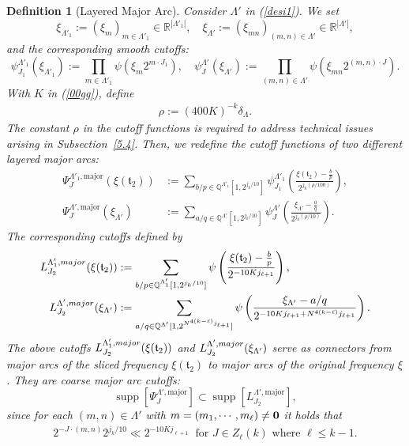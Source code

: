 \documentclass[10pt,a4paper]{amsart}
\newtheorem{definition}{Definition}\numberwithin{definition}{section}
\numberwithin{equation}{section}
\begin{document}
 \begin{definition}[Layered Major Arc] 
Consider $\Lambda'$ in (\ref{desi1}). We set
\[
\xi_{\Lambda'_{1}} := (\xi_{m})_{m\in \Lambda'_{1}} \in \mathbb{R}^{|\Lambda'_{1}|}, \quad
\xi_{\Lambda'} := (\xi_{mn})_{(m,n) \in \Lambda'} \in \mathbb{R}^{|\Lambda'|},
\]
and the corresponding smooth cutoffs:
\[
\psi^{\Lambda'_{1}}_{J_1}(\xi_{\Lambda'_{1}}) := \prod_{m \in \Lambda'_{1}} \psi\left( \xi_{m}   2^{m\cdot J_1} \right), \quad
\psi^{\Lambda'}_{J}(\xi_{\Lambda'}) := \prod_{(m,n)\in \Lambda'} \psi\left( \xi_{mn}   2^{(m,n)\cdot J} \right).
\]
With  $K$ in (\ref{00gg}), define  \begin{align}\label{rho3}
	\rho:=(400K)^{-k}\delta_{\Lambda}.
\end{align}The constant $\rho$ in the cutoff functions is required to address technical issues arising in Subsection~\ref{5.4}. Then,
we redefine the cutoff functions of two different layered major arcs:
\begin{align}\label{4022k9}
\Psi^{\Lambda'_{1},\mathrm{major}}_{J}(\xi(\mathfrak{t}_2)) &:= \sum_{b/p \in \mathbb{Q}^{\Lambda'_{1}}[1, 2^{j_k/10}]}
\psi^{\Lambda'_{1}}_{J_1} \left( \frac{\xi(\mathfrak{t}_2) - \frac{b}{p}}{2^{j_k(\rho/100)}} \right), \nonumber \\
\Psi^{\Lambda',\mathrm{major}}_{J}(\xi_{\Lambda'}) &:= \sum_{a/q \in \mathbb{Q}^{\Lambda'}[1, 2^{j_k/10}]}
\psi^{\Lambda'}_{J} \left( \frac{\xi_{\Lambda'} - \frac{a}{q}}{2^{j_k(\rho/10)}} \right).
\end{align}
The corresponding  cutoffs defined by
\begin{align}
L_{J_2}^{\Lambda'_1,\rm{major}}(\xi(\mathfrak{t}_2))&:=\sum_{b/p\in \mathbb{Q}^{\Lambda'_1}[1,2^{j_k/10}]} \psi\left(\frac{\xi(\mathfrak{t}_{2}) -\frac{b}{p}}{ 2^{-10Kj_{\ell+1}} }\right),\label{88332}\\
L^{\Lambda',\rm{major}}_{J_2}(\xi_{\Lambda'})&:= \sum_{a/q\in \mathbb{Q}^{\Lambda'}[1,2^{N^{4(k-\ell)}j_{\ell+1}}]} \psi\left(\frac{\xi_{\Lambda'}-a/q}{2^{-10Kj_{\ell+1}+N^{4(k-\ell)}j_{\ell+1}  }}\right).\label{56}
\end{align}
The above cutoffs $L_{J_2}^{\Lambda'_1,\rm{major}}(\xi(\mathfrak{t}_2))$ and $L^{\Lambda',\rm{major}}_{J_2}(\xi_{\Lambda'})$ serve as connectors from major arcs of the sliced frequency $\xi(\mathfrak{t}_2)$ to major arcs of the original frequency $\xi$. 
They are  coarse major arc cutoffs:
\[
\operatorname{supp} \left[ \Psi^{\Lambda',\mathrm{major}}_{J} \right]
\subset \operatorname{supp} \left[L^{\Lambda',\mathrm{major}}_{J_2} \right],\]
since for each $  (m,n) \in \Lambda'  $ with $m=(m_1,\cdots,m_\ell)\ne {\bf 0}$   it holds that
\begin{align}\label{pik3}
2^{-J \cdot (m,n)}   2^{j_k/10} \ll 2^{-10 K j_{\ell+1}}\ \text{ for $J\in Z_\ell(k)$  where $\ell\le k-1$}.
\end{align}
 \end{definition}
\end{document}
